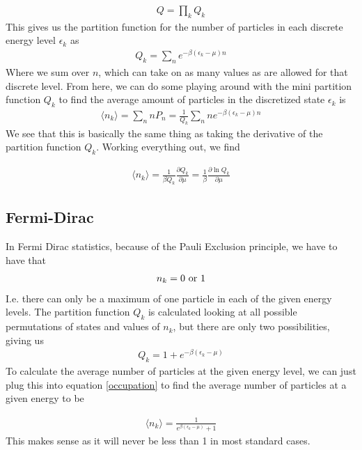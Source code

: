 \begin{align}
Q = \prod_k Q_k
\end{align}
This gives us the partition function for the number of particles in each discrete energy level $\epsilon_k$ as 
\begin{align}
Q_k = \sum_{n} e^{-\beta(\epsilon_k - \mu)n}
\end{align}
Where we sum over $n$, which can take on as many values as are allowed for that discrete level. From here, we can do some playing around with the mini partition function $Q_k$ to find the average amount of particles in the discretized state $\epsilon_k$ is
\begin{align}
    \langle n_k \rangle = \sum_n nP_n = \frac{1}{Q_k} \sum_n n e^{-\beta(\epsilon_k-\mu)n}
\end{align}
We see that this is basically the same thing as taking the derivative of the partition function $Q_k$. Working everything out, we find

\begin{align}\label{occupation}
\langle n_k \rangle  =\frac{1}{\beta Q_k}\frac{\partial Q_k}{\partial \mu} = \frac{1}{\beta}\frac{\partial \ln Q_k}{\partial \mu}
\end{align}

\subsection{Fermi-Dirac}
In Fermi Dirac statistics, because of the Pauli Exclusion principle, we have to have that
\begin{align}
n_k = 0~\rm{or}~1
\end{align}
I.e. there can only be a maximum of one particle in each of the given energy levels.
The partition function $Q_k$ is calculated looking at all possible permutations of states and values of $n_k$, but there are only two possibilities, giving us
\begin{align}
Q_k= 1 + e^{-\beta(\epsilon_k-\mu)}
\end{align}
To calculate the average number of particles at the given energy level, we can just plug this into equation \ref{occupation} to find the average number of particles at a given energy to be

\begin{align}
\langle n_k \rangle =\frac{1}{e^{\beta(\epsilon_k - \mu)} + 1}
\end{align}
 This makes sense as it will never be less than 1 in most standard cases.

